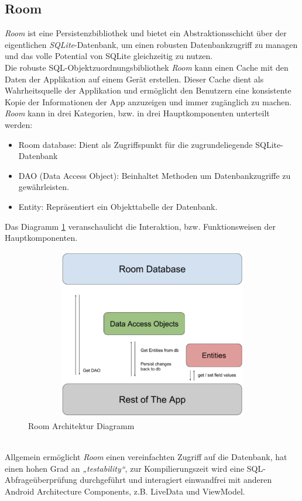 \subsection*{Room}
\label{sec:Room}
\textit{Room} ist eine Persistenzbibliothek und bietet ein Abstraktionsschicht über der eigentlichen \textit{\acs{SQL}ite}-Datenbank, um einen 
robusten Datenbankzugriff zu managen und das volle Potential von \acs{SQL}ite gleichzeitig zu nutzen. \cite{room.2017}
\\ 
\linebreak
Die robuste \acs{SQL}-Objektzuordnungsbibliothek \textit{Room} kann einen Cache mit den Daten der Applikation auf einem Gerät erstellen. Dieser 
Cache dient als Wahrheitsquelle der Applikation und ermöglicht den Benutzern eine konsistente Kopie der Informationen der App anzuzeigen 
und immer zugänglich zu machen. \textit{Room} kann in drei Kategorien, bzw. in drei Hauptkomponenten unterteilt werden:
\begin{itemize}
    \item Room database: Dient als Zugriffspunkt für die zugrundeliegende SQLite-Datenbank
    \item DAO (Data Access Object): Beinhaltet Methoden um Datenbankzugriffe zu gewährleisten.
    \item Entity: Repräsentiert ein Objekttabelle der Datenbank.
\end{itemize}
Das Diagramm \ref{pic:roomarchitecturediagramm} veranschaulicht die Interaktion, bzw. Funktionsweisen der Hauptkomponenten.
\begin{figure}[hbt!]
    \centering
    \includegraphics[width=15cm,height=7.5cm,keepaspectratio]{2Grundlagen/Bilder/roomArchitecture.png}
    \caption{Room Architektur Diagramm \cite{roomdiagr.2017}}
    \label{pic:roomarchitecturediagramm}
\end{figure} 
\\ 
Allgemein ermöglicht \textit{Room} einen vereinfachten Zugriff auf die Datenbank, hat einen hohen Grad an \textit{„testability“}, zur 
Kompilierungszeit wird eine \acs{SQL}-Abfrageüberprüfung durchgeführt und interagiert einwandfrei mit anderen Android Architecture 
Components, z.B. LiveData und ViewModel.

